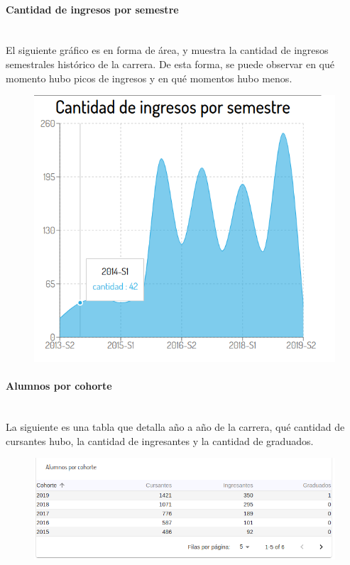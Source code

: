 \paragraph{Cantidad de ingresos por semestre} \mbox{}\\
El siguiente gráfico es en forma de área, y muestra la cantidad de ingresos semestrales histórico de la carrera. De esta forma, se puede observar en qué momento hubo picos de ingresos y en qué momentos hubo menos.

\begin{figure}[!htbp]
  \centering
    \includegraphics[scale=0.4]{images/seguimiento-academico/sa-ingresossemestre.png}
  \label{fig:sa-ingresos-semestre}
\end{figure}

\paragraph{Alumnos por cohorte} \mbox{}\\
La siguiente es una tabla que detalla año a año de la carrera, qué cantidad de cursantes hubo, la cantidad de ingresantes y la cantidad de graduados.

\begin{figure}[!htbp]
  \centering
    \includegraphics[scale=0.4]{images/seguimiento-academico/sa-alumnos-cohorte.png}
  \label{fig:sa-alumnos-cohorte}
\end{figure}

